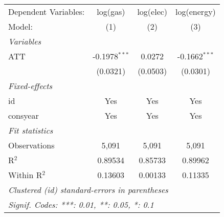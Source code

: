 
\begin{tabular}{lccc}
   \tabularnewline\midrule\midrule
   Dependent Variables: & log(gas)        & log(elec) & log(energy)\\
   Model:               & (1)             & (2)       & (3)\\
   \midrule \emph{Variables} &   &   &  \\
   ATT                  & -0.1978$^{***}$ & 0.0272    & -0.1662$^{***}$\\
                        & (0.0321)        & (0.0503)  & (0.0301)\\
   \midrule \emph{Fixed-effects} &   &   &  \\
   id                   & Yes             & Yes       & Yes\\
   consyear             & Yes             & Yes       & Yes\\
   \midrule \emph{Fit statistics} &   &   &  \\
   Observations         & 5,091           & 5,091     & 5,091\\
   R$^2$                & 0.89534         & 0.85733   & 0.89962\\
   Within R$^2$         & 0.13603         & 0.00133   & 0.11335\\
   \midrule\midrule\multicolumn{4}{l}{\emph{Clustered (id) standard-errors in parentheses}}\\
   \multicolumn{4}{l}{\emph{Signif. Codes: ***: 0.01, **: 0.05, *: 0.1}}\\
\end{tabular}



